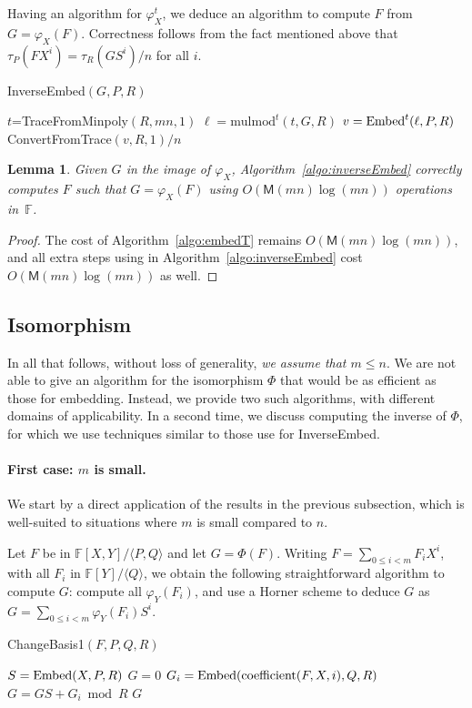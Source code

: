 \documentclass[12pt]{article}
\def\M {\ensuremath{\mathsf{M}}}
\def\F {\ensuremath{\mathbb{F}}}
\def\coeff {\ensuremath{\mathrm{coefficient}}}
\def\mulmod {\ensuremath{\mathrm{mulmod}}}
\newtheorem{Lemma}{Lemma}
\begin{document}
Having an algorithm for $\varphi_X^t$, we deduce an algorithm to
compute $F$ from $G=\varphi_X(F)$. Correctness follows from the fact
mentioned above that $\tau_P(F X^i) =\tau_R(G S^i)/n$ for all $i$.

\begin{algorithm}[H]
  \caption{InverseEmbed$(G,P,R)$}
  \begin{algorithmic}[1]
  \STATE $t$=TraceFromMinpoly$(R,mn,1)$
  \STATE $\ell = \mulmod^t(t,G,R)$
  \STATE $v={\rm Embed}^t(\ell,P,R)$
  \RETURN ConvertFromTrace$(v, R, 1)/n$
  \end{algorithmic}\label{algo:inverseEmbed}
\end{algorithm}

\begin{Lemma}
  Given $G$ in the image of $\varphi_X$, Algorithm~\ref{algo:inverseEmbed}
  correctly computes $F$ such that $G=\varphi_X(F)$ using
  $O(\M(mn)\log(mn))$ operations in~$\F$.
\end{Lemma}
\begin{proof}
  The cost of Algorithm~\ref{algo:embedT} remains $O(\M(mn)\log(mn))$,
  and all extra steps using in Algorithm~\ref{algo:inverseEmbed} 
  cost $O(\M(mn)\log(mn))$ as well.
\end{proof}



\subsection{Isomorphism} 

In all that follows, without loss of generality, {\em we assume that
  $m\le n$}. We are not able to give an algorithm for the isomorphism
$\Phi$ that would be as efficient as those for embedding. Instead, we
provide two such algorithms, with different domains of applicability.
In a second time, we discuss computing the inverse of $\Phi$,
for which we use techniques similar to those use for InverseEmbed.

\paragraph{First case: $m$ is small.}
We start by a direct application of the results in the previous
subsection, which is well-suited to situations where $m$ is small compared to $n$. 

Let $F$ be in $\F[X,Y]/\langle P,Q\rangle$ and let
$G=\Phi(F)$. Writing $F=\sum_{0 \le i < m} F_i X^i$, with all $F_i$ in
$\F[Y]/\langle Q \rangle$, we obtain the following straightforward
algorithm to compute $G$: compute all $\varphi_Y(F_i)$, and use a
Horner scheme to deduce $G$ as $G=\sum_{0 \le i < m} \varphi_Y(F_i) S^i$.
\begin{algorithm}[H]
  \caption{ChangeBasis1$(F,P,Q,R)$}
  \begin{algorithmic}[1]
    \STATE $S={\rm Embed}(X,P,R)$
    \STATE $G=0$
    \STATE $G_i = {\rm Embed}(\coeff(F,X,i),Q,R)$
    \STATE $G = GS+G_i \bmod R$
    \ENDFOR
    \RETURN $G$
  \end{algorithmic}
  \label{algo:iso1}
\end{algorithm}
\end{document}
